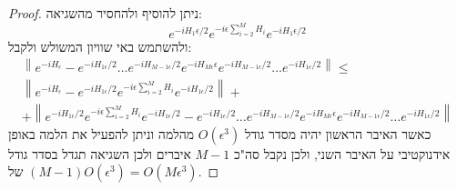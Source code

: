 \documentclass{tstextbook}
\begin{document}
\begin{proof}
ניתן להוסיף ולהחסיר מהשגיאה:
$$e^{-i H_{1}\epsilon/2}e^{-i\epsilon\sum_{i=2}^{M}H_{i}}e^{-i H_{1}\epsilon/2}$$
ולהשתמש באי שוויון המשולש ולקבל:
$$\begin{gather}\left\|e^{-iH_{\epsilon}}-e^{-iH_{1\epsilon}/2}\ldots e^{-iH_{M-1\epsilon}/2}e^{-iH_{M\epsilon}\epsilon}e^{-iH_{M-1\epsilon}/2}\ldots e^{-iH_{1\epsilon}/2}\right\|\leq\\\left\|e^{-iH_{\epsilon}}-e^{-iH_{1\epsilon}/2}e^{-i\epsilon\sum\limits_{i=2}^{M}H_{i}}e^{-iH_{1\epsilon}/2}\right\|+\\+\left\|e^{-iH_{1\epsilon}/2}e^{-i\epsilon\sum\limits_{i=2}^{M}H_{i}}e^{-iH_{1\epsilon}/2}-e^{-iH_{1\epsilon}/2}\ldots e^{-iH_{M-1\epsilon}/2}e^{-iH_{M\epsilon}\epsilon}e^{-iH_{M-1\epsilon}/2}\ldots e^{-iH_{1\epsilon}/2}\right\| 
\end{gather}$$
כאשר האיבר הראשון יהיה מסדר גודל \(O\left( \epsilon^{3} \right)\) מהלמה וניתן להפעיל את הלמה באופן אידנוקטיבי על האיבר השני, ולכן נקבל סה"כ \(M-1\) איברים ולכן השגיאה תגדל בסדר גודל של \((M-1)O\left( \epsilon^{3} \right)=O\left( M\epsilon^{3} \right)\).

\end{proof}
\end{document}
